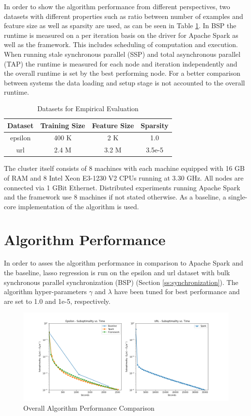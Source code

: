In order to show the algorithm performance from different perspectives, two datasets with different properties such as ratio between number of examples and feature size as well as sparsity are used, as can be seen in Table \ref{tab:datasets}.
In BSP the runtime is measured on a per iteration basis on the driver for Apache Spark as well as the framework.
This includes scheduling of computation and execution.
When running stale synchronous parallel (SSP) and total asynchronous parallel (TAP) the runtime is measured for each node and iteration independently and the overall runtime is set by the best performing node.
For a better comparison between systems the data loading and setup stage is not accounted to the overall runtime.
\begin{table}[h]
\begin{center}
\begin{tabular}{ | c | c | c | c |}
\hline
\textbf{Dataset} & \textbf{Training Size} & \textbf{Feature Size} & \textbf{Sparsity} \\ \hline
epsilon & 400 K & 2 K & 1.0 \\ \hline
url & 2.4 M & 3.2 M & 3.5e-5 \\
\hline
\end{tabular}
\end{center}
\caption{Datasets for Empirical Evaluation}
\label{tab:datasets}
\end{table}

The cluster itself consists of 8 machines with each machine equipped with 16 GB of RAM and 8 Intel Xeon E3-1230 V2 CPUs running at 3.30 GHz.
All nodes are connected via 1 GBit Ethernet.
Distributed experiments running Apache Spark and the framework use 8 machines if not stated otherwise.
As a baseline, a single-core implementation of the algorithm is used.

\section{Algorithm Performance}
In order to asses the algorithm performance in comparison to Apache Spark and the baseline, lasso regression is run on the epsilon and url dataset with bulk synchronous parallel synchronization (BSP) (Section \ref{ss:synchronization}).
The algorithm hyper-parameters $\gamma$ and $\lambda$ have been tuned for best performance and are set to 1.0 and 1e-5, respectively.
\begin{figure}[ht]
\centering
\includegraphics[width=1.0\textwidth]{img/overall_perf_cmp.png}
\caption{Overall Algorithm Performance Comparison}
\label{fig:algo_perf_cmp}
\end{figure}



